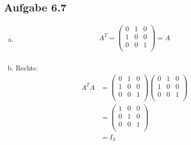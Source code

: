 \documentclass{standalone}
\begin{document}
\subsection{Aufgabe 6.7}
\begin{enumerate}[a)]

\item
    \begin{align*}
        A^T = \left(\begin{array}{rrr}
        0 & 1 & 0 \\
        1 & 0 & 0 \\
        0 & 0 & 1 \\
        \end{array}\right) = A \\
    \end{align*}

\item
    Rechts:
    \begin{align*}
        A^TA &= \left(\begin{array}{rrr}
        0 & 1 & 0 \\
        1 & 0 & 0 \\
        0 & 0 & 1 \\
        \end{array}\right)\left(\begin{array}{rrr}
        0 & 1 & 0 \\
        1 & 0 & 0 \\
        0 & 0 & 1 \\
        \end{array}\right) \\
        &= \left(\begin{array}{rrr}
        1 & 0 & 0 \\
        0 & 1 & 0 \\
        0 & 0 & 1 \\
        \end{array}\right) \\
        &= I_3 \\
    \end{align*}


\end{enumerate}
\end{document}
